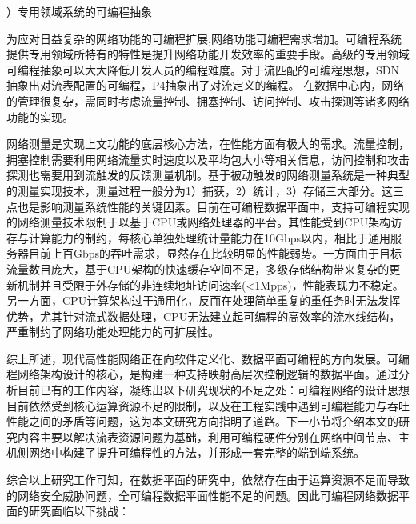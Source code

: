 {）专用领域系统的可编程抽象}



为应对日益复杂的网络功能的可编程扩展,网络功能可编程需求增加。可编程系统提供专用领域所特有的特性是提升网络功能开发效率的重要手段。高级的专用领域可编程抽象可以大大降低开发人员的编程难度。对于流匹配的可编程思想，SDN抽象出对流表配置的可编程，P4抽象出了对流定义的编程。
在数据中心内，网络的管理很复杂，需同时考虑流量控制、拥塞控制、访问控制、攻击探测等诸多网络功能的实现。



网络测量是实现上文功能的底层核心方法，在性能方面有极大的需求。流量控制，拥塞控制需要利用网络流量实时速度以及平均包大小等相关信息，访问控制和攻击探测也需要用到流触发的反馈测量机制。基于被动触发的网络测量系统是一种典型的测量实现技术，测量过程一般分为1）捕获，2）统计，3）存储三大部分。这三点也是影响测量系统性能的关键因素。目前在可编程数据平面中，支持可编程实现的网络测量技术限制于以基于CPU或网络处理器的平台。其性能受到CPU架构访存与计算能力的制约，每核心单独处理统计量能力在10Gbps以内，相比于通用服务器目前上百Gbps的吞吐需求，显然存在比较明显的性能弱势。一方面由于目标流量数目庞大，基于CPU架构的快速缓存空间不足，多级存储结构带来复杂的更新机制并且受限于外存储的非连续地址访问速率(<1Mpps)，性能表现力不稳定。另一方面，CPU计算架构过于通用化，反而在处理简单重复的重任务时无法发挥优势，尤其针对流式数据处理，CPU无法建立起可编程的高效率的流水线结构，严重制约了网络功能处理能力的可扩展性。


综上所述，现代高性能网络正在向软件定义化、数据平面可编程的方向发展。可编程网络架构设计的核心，是构建一种支持映射高层次控制逻辑的数据平面。通过分析目前已有的工作内容，凝练出以下研究现状的不足之处：可编程网络的设计思想目前依然受到核心运算资源不足的限制，以及在工程实践中遇到可编程能力与吞吐性能之间的矛盾等问题，这为本文研究方向指明了道路。下一小节将介绍本文的研究内容主要以解决流表资源问题为基础，利用可编程硬件分别在网络中间节点、主机侧网络中构建了提升可编程性的方法，并形成一套完整的端到端系统。


\label{chap13}



\label{chap131}

综合以上研究工作可知，在数据平面的研究中，依然存在由于运算资源不足而导致的网络安全威胁问题，全可编程数据平面性能不足的问题。因此可编程网络数据平面的研究面临以下挑战：

